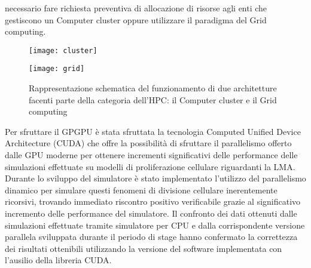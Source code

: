 necessario fare richiesta preventiva di allocazione di risorse agli enti che 
gestiscono un Computer cluster oppure utilizzare il paradigma del Grid 
computing.
\begin{figure}[t]
    \begin{minipage}[b]{.5\linewidth}
        \centering
        \texttt{[image: cluster]}
    \end{minipage}
    \begin{minipage}[b]{.5\linewidth}
        \centering
        \texttt{[image: grid]}
    \end{minipage}
    \caption{Rappresentazione schematica del funzionamento di due architetture 
        facenti parte della categoria dell'HPC: il Computer cluster e il 
        Grid computing}
    \label{fig:cluster-grid}
\end{figure}
Per sfruttare il GPGPU è stata sfruttata la tecnologia
Computed Unified Device Architecture (CUDA) che offre la possibilità di 
sfruttare il parallelismo offerto dalle GPU moderne per ottenere incrementi 
significativi delle performance delle simulazioni effettuate su modelli di 
proliferazione cellulare riguardanti la LMA.
Durante lo sviluppo del simulatore è stato implementato l'utilizzo del 
parallelismo dinamico per simulare questi fenomeni 
di divisione cellulare inerentemente ricorsivi, trovando immediato riscontro 
positivo verificabile grazie al significativo incremento delle performance 
del simulatore. Il confronto dei dati ottenuti dalle simulazioni effettuate
tramite simulatore per CPU e dalla corrispondente versione parallela 
sviluppata durante il periodo di stage hanno confermato la correttezza dei
risultati ottenibili utilizzando la versione del software implementata con
l'ausilio della libreria CUDA.
